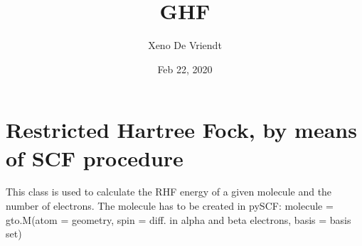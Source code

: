 \documentclass[letterpaper,10pt,english]{sphinxmanual}
\title{GHF}
\date{Feb 22, 2020}
\author{Xeno De Vriendt}
\begin{document}
\pagestyle{empty}
\sphinxmaketitle
\pagestyle{plain}
\sphinxtableofcontents
\pagestyle{normal}
\label{\detokenize{index::doc}}

\label{\detokenize{RHF:module-ghf.RHF}}

\chapter{Restricted Hartree Fock, by means of SCF procedure}
\label{\detokenize{RHF:restricted-hartree-fock-by-means-of-scf-procedure}}\label{\detokenize{RHF::doc}}
This class is used to calculate the RHF energy of a given molecule and the number of electrons.
The molecule has to be created in pySCF:
molecule = gto.M(atom = geometry, spin = diff. in alpha and beta electrons, basis = basis set)
\end{document}

